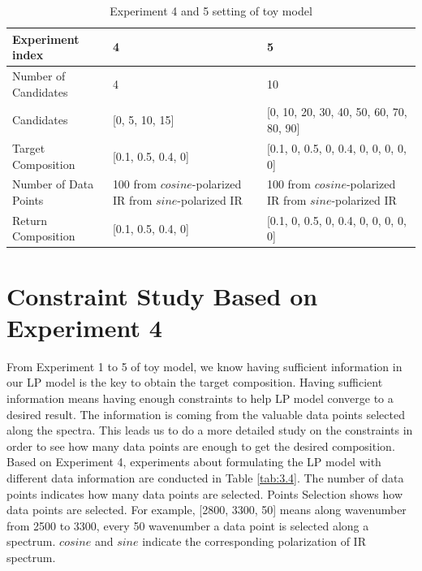 \begin{table} \small 
\begin{center}
\begin{tabular}{| l | p{5cm} | p{6cm} |}
\hline
Experiment index & 4 & 5\\
\hline
Number of Candidates & 4 & 10 \\
\hline
Candidates & [0, 5, 10, 15] & [0, 10, 20, 30, 40, 50, 60, 70, 80, 90] \\
\hline
Target Composition & [0.1, 0.5, 0.4, 0] & [0.1, 0, 0.5, 0, 0.4, 0, 0, 0, 0, 0]\\
\hline
Number of Data Points & 100 from $cosine$-polarized IR \newline 100 from $sine$-polarized IR & 100 from $cosine$-polarized IR \newline 100 from $sine$-polarized IR\\
\hline
Return Composition & [0.1, 0.5, 0.4, 0] & [0.1, 0, 0.5, 0, 0.4, 0, 0, 0, 0, 0] \\
\hline
\end{tabular} 
\caption{Experiment 4 and 5 setting of toy model}\label{tab:3.3}
\end{center}
\end{table}		

\section{Constraint Study Based on Experiment 4}

From Experiment 1 to 5 of toy model, we know having sufficient information in our LP model is the key to obtain the target composition. Having sufficient information means having enough constraints to help LP model converge to a desired result. The information is coming from the valuable data points selected along the spectra. This leads us to do a more detailed study on the constraints in order to see how many data points are enough to get the desired composition.\\ 

Based on Experiment 4, experiments about formulating the LP model with different data information are conducted in Table \ref{tab:3.4}. The number of data points indicates how many data points are selected. Points Selection shows how data points are selected. For example, [2800, 3300, 50] means along wavenumber from 2500 to 3300, every 50 wavenumber a data point is selected along a spectrum. $cosine$ and $sine$ indicate the corresponding polarization of IR spectrum. \\

